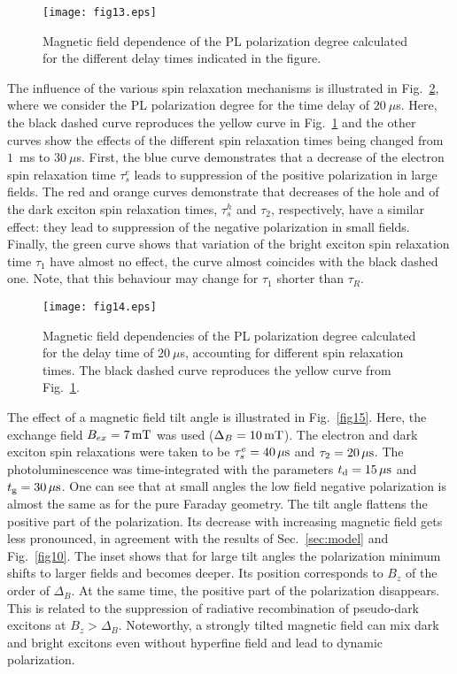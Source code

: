 \documentclass[twocolumn,showpacs,preprintnumbers,amsmath,amssymb,aps]{revtex4-1}
\begin{document}
\begin{figure}[t]
\centering
\texttt{[image: fig13.eps]}
\caption{Magnetic field dependence of the PL polarization degree
calculated for the different delay times indicated in the figure.}
\label{fig13}
\end{figure}

The influence of the various spin relaxation  mechanisms is
illustrated in Fig.~\ref{fig14}, where we consider the PL
polarization degree for the time delay of $20~\mu$s. Here, the black
dashed curve reproduces the yellow curve in Fig.~\ref{fig13} and the
other curves show the effects of the different spin relaxation times
being changed from $1$~ms to $30~\mu$s. First, the blue curve
demonstrates that a decrease of the electron spin relaxation time
$\tau_s^e$ leads to suppression of the positive polarization in
large fields. The red and orange curves demonstrate that decreases
of the hole and of the dark exciton spin relaxation times,
$\tau_s^h$ and $\tau_2$, respectively, have a similar effect: they
lead to suppression of the negative polarization in small fields.
Finally, the green curve shows that variation of the bright exciton
spin relaxation time $\tau_1$ have almost no effect, the curve
almost coincides with the black dashed one. Note, that this
behaviour may change for $\tau_1$ shorter than $\tau_R$.

\begin{figure}[t]
\centering
\texttt{[image: fig14.eps]}
\caption{ Magnetic field dependencies of the PL polarization degree
calculated for the delay time of $20~\mu$s, accounting for different
spin relaxation times. The black dashed curve reproduces the yellow
curve from Fig.~\ref{fig13}.} \label{fig14}
\end{figure}


The effect of a magnetic field tilt angle is illustrated in
Fig.~\ref{fig15}. Here, the exchange field $B_{ex} = 7 \, {\rm mT}$
was used ($\Delta_B = 10\,{\rm mT}$). The electron and dark exciton
spin relaxations were taken to be $\tau_s^e = 40\, {\rm \mu s}$ and
$\tau_2 = 20\,{\rm \mu s}$. The photoluminescence was
time-integrated with the parameters $t_{\rm d} = 15\,{\rm \mu s}$
and $t_{\rm g} = 30 \,{\rm \mu s}$. One can see that at small angles
the low field negative polarization is almost the same as for the
pure Faraday geometry. The tilt angle flattens the positive part of
the polarization. Its decrease with increasing magnetic field gets
less pronounced, in agreement with the results of
Sec.~\ref{sec:model} and Fig.~\ref{fig10}. The inset shows that for
large tilt angles the polarization minimum shifts to larger fields
and becomes deeper. Its position corresponds to $B_z$ of the order
of $\Delta_B$. At the same time, the positive part of the
polarization disappears. This is related to the suppression of
radiative recombination of pseudo-dark excitons at $B_z > \Delta_B$.
Noteworthy, a strongly tilted magnetic field can mix dark and bright
excitons even without hyperfine field and lead to dynamic
polarization.
\end{document}
